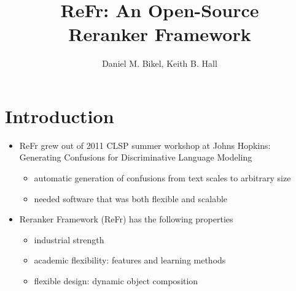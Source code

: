 \documentclass[noback,portrait,twocolumn]{cuposter}
\begin{document}



\def\bordercolor{BoundaryColor}
\def\sectionheadcolor{BrightRed}
\def\colsepcolor{BoundaryColor}


\newcommand{\clb}[1]{{\color{Red} \bf #1}}

\title{ReFr: An Open-Source \\
Reranker Framework}
\author{Daniel M. Bikel, Keith B. Hall}  
\address{Google Inc.}

\setlength{\SpaceBeforeText}{-2cm}

\makeposter

\renewcommand{\SectionColour}{\color{Blue}}
\section{Introduction}
\begin{itemize}
\item ReFr grew out of 2011 CLSP summer workshop at Johns Hopkins: \\
      Generating Confusions for Discriminative Language Modeling
  \begin{itemize}
  \item automatic generation of confusions from text scales to arbitrary size
  \item needed software that was both flexible and scalable
  \end{itemize}
\item Reranker Framework (ReFr) has the following properties
  \begin{itemize}
    \item industrial strength
    \item academic flexibility: features and learning methods
    \item flexible design: dynamic object composition
  \end{itemize}
\end{itemize}
\end{document}
